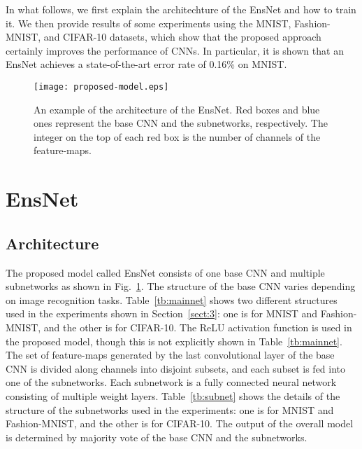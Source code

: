 \documentclass[a4j]{article}
\begin{document}
In what follows, we first explain the architechture of the EnsNet and how to train it. We then provide results of some experiments using the MNIST\cite{MNIST}, Fashion-MNIST\cite{Fashion-MNIST}, and CIFAR-10\cite{Cifar-10} datasets, which show that the proposed approach certainly improves the performance of CNNs. In particular, it is shown that an EnsNet achieves a state-of-the-art error rate of 0.16\% on MNIST. 



\begin{figure}[t]
\centering
\texttt{[image: proposed-model.eps]}
\caption{An example of the architecture of the EnsNet. Red boxes and blue ones represent the base CNN and the subnetworks, respectively. The integer on the top of each red box is the number of channels of the feature-maps. }
\label{fig:proposed-model}
\end{figure}

\section{EnsNet}
\subsection{Architecture} \label{subsec:config}
The proposed model called EnsNet consists of one base CNN and multiple subnetworks as shown in Fig.~\ref{fig:proposed-model}. The structure of the base CNN varies depending on image recognition tasks. Table~\ref{tb:mainnet} shows two different structures used in the experiments shown in Section~\ref{sect:3}: one is for MNIST and Fashion-MNIST, and the other is for CIFAR-10. The ReLU activation function is used in the proposed model, though this is not explicitly shown in Table~\ref{tb:mainnet}. The set of feature-maps generated by the last convolutional layer of the base CNN is divided along channels into disjoint subsets, and each subset is fed into one of the subnetworks. Each subnetwork is a fully connected neural network consisting of multiple weight layers. Table~\ref{tb:subnet} shows the details of the structure of the subnetworks used in the experiments: one is for MNIST and Fashion-MNIST, and the other is for CIFAR-10. The output of the overall model is determined by majority vote of the base CNN and the subnetworks. 
\end{document}
